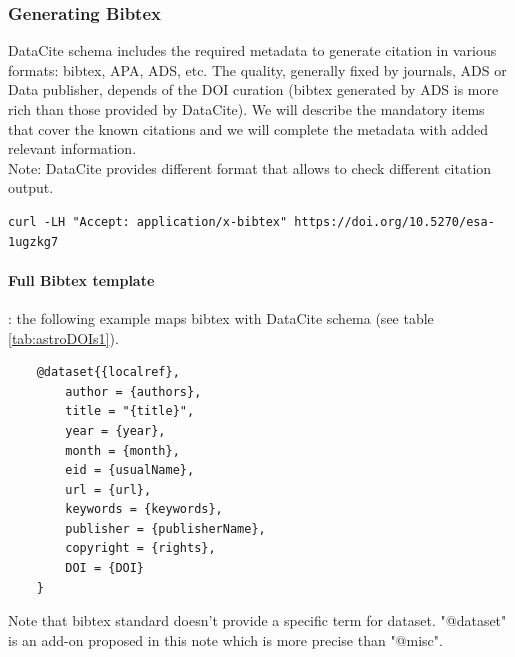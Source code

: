 \documentclass[11pt,a4paper]{ivoa}
\begin{document}
\subsubsection{Generating Bibtex}
DataCite schema includes the required metadata to generate citation in various formats: bibtex, APA, ADS, etc. The quality, generally fixed by journals, ADS or Data publisher, depends of the DOI curation (bibtex generated by ADS is more rich than those provided by DataCite). 
We will describe the mandatory items that cover the known citations and we will complete the metadata with added relevant information.\\


Note: DataCite provides different format that allows to check different citation output.

\begin{verbatim}
curl -LH "Accept: application/x-bibtex" https://doi.org/10.5270/esa-1ugzkg7
\end{verbatim}


\paragraph{Full Bibtex template} : the following example maps bibtex with DataCite schema (see table \ref{tab:astroDOIs1}).

\begin{lstlisting}
	@dataset{{localref},
		author = {authors},
		title = "{title}",
		year = {year},
		month = {month},
		eid = {usualName},
		url = {url},
		keywords = {keywords},
		publisher = {publisherName},
		copyright = {rights},
		DOI = {DOI}
	}
\end{lstlisting}

Note that bibtex standard doesn't provide a specific term for dataset. 
"@dataset" is an add-on proposed in this note which is more precise than "@misc".\\
\end{document}
